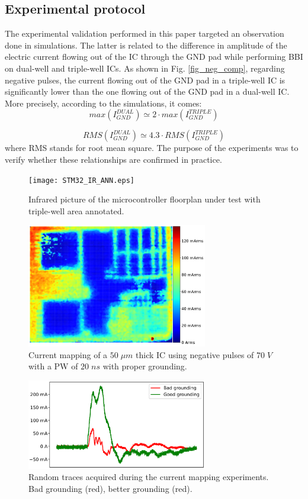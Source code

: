\documentclass[10pt, conference, compsocconf]{IEEEtran}
\begin{document}
\subsection{Experimental protocol}
The experimental validation performed in this paper targeted an observation done in simulations. The latter is related to the difference in amplitude of the electric current flowing out of the IC through the GND pad while performing BBI on dual-well and triple-well ICs. As shown in Fig. \ref{fig_neg_comp}, regarding negative pulses, the current flowing out of the GND pad in a triple-well IC is significantly lower than the one flowing out of the GND pad in a dual-well IC. More precisely, according to the simulations, it comes:
\begin{equation}
max(I_{GND}^{DUAL}) \simeq 2 \cdot max(I_{GND}^{TRIPLE})
\end{equation}

\begin{equation}
RMS(I_{GND}^{DUAL}) \simeq 4.3 \cdot RMS(I_{GND}^{TRIPLE})
\end{equation}
where RMS stands for root mean square.
The purpose of the experiments was to verify whether these relationships are confirmed in practice.

\begin{figure}[!ht]
\centering
\texttt{[image: STM32\_IR\_ANN.eps]}
\caption{Infrared picture of the microcontroller floorplan under test with triple-well area annotated.}
\label{fig_stm_ir}
\end{figure}

\begin{figure}[!ht]
\centering
\includegraphics[width=3.1in]{A4_carto11_.pdf}
\caption{Current mapping of a $50 \; \mu m$ thick IC using negative pulses of $70 \; V$ with a PW of $20 \; ns$ with proper grounding.}
\label{fig_carto11}
\end{figure}

\begin{figure}[!ht]
\centering
\includegraphics[width=3.1in]{grounding.eps}
\caption{Random traces acquired during the current mapping experiments. Bad grounding (red), better grounding (red).}
\label{fig_traces11}
\end{figure}
\end{document}

